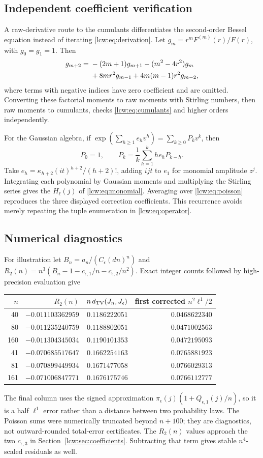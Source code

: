 \documentclass[11pt,letterpaper]{article}
\theoremstyle{remark}\newtheorem{remark}[theorem]{Remark}
\begin{document}
\subsection{Independent coefficient verification}
A raw-derivative route to the cumulants differentiates the second-order Bessel equation instead of iterating \eqref{lcw:eq:derivation}. Let $g_m=r^mF^{(m)}(r)/F(r)$, with $g_0=g_1=1$. Then
\begin{align}
 g_{m+2}={}&-(2m+1)g_{m+1}-(m^2-4r^2)g_m\notag\\
 &+8mr^2g_{m-1}+4m(m-1)r^2g_{m-2},\label{lcw:eq:rawrec}
\end{align}
where terms with negative indices have zero coefficient and are omitted. Converting these factorial moments to raw moments with Stirling numbers, then raw moments to cumulants, checks \eqref{lcw:eq:cumulants} and higher orders independently.

For the Gaussian algebra, if
$\exp(\sum_{h\ge1}e_hv^h)=\sum_{k\ge0}P_kv^k$, then
\[
 P_0=1,\qquad P_k=\frac1k\sum_{h=1}^k h e_h P_{k-h}.
\]
Take $e_h=\kappa_{h+2}(it)^{h+2}/(h+2)!$, adding $ijt$ to $e_1$ for monomial amplitude $z^j$. Integrating each polynomial by Gaussian moments and multiplying the Stirling series gives the $H_\ell(j)$ of \eqref{lcw:eq:monomial}. Averaging over \eqref{lcw:eq:poisson} reproduces the three displayed correction coefficients. This recurrence avoids merely repeating the tuple enumeration in \eqref{lcw:eq:operator}.

\subsection{Numerical diagnostics}
For illustration let $B_n=a_n/(C_\epsilon(dn)^n)$ and
$R_2(n)=n^3(B_n-1-c_{\epsilon,1}/n-c_{\epsilon,2}/n^2)$.
Exact integer counts followed by high-precision evaluation give
\begin{center}
\begin{tabular}{rrrr}
\toprule
$n$ & $R_2(n)$ & $n\,d_{\rm TV}(J_n,J_\epsilon)$ & first corrected $n^2\ell^1/2$\\
\midrule
40  & $-0.011103362959$ & $0.1186222051$ & $0.0468622340$\\
80  & $-0.011235240759$ & $0.1188802051$ & $0.0471002563$\\
160 & $-0.011304345034$ & $0.1190101353$ & $0.0472195093$\\
41  & $-0.070685517647$ & $0.1662254163$ & $0.0765881923$\\
81  & $-0.070899449934$ & $0.1671477058$ & $0.0766029313$\\
161 & $-0.071006847771$ & $0.1676175746$ & $0.0766112777$\\
\bottomrule
\end{tabular}
\end{center}
The final column uses the signed approximation $\pi_\epsilon(j)(1+Q_{\epsilon,1}(j)/n)$, so it is a half $\ell^1$ error rather than a distance between two probability laws. The Poisson sums were numerically truncated beyond $n+100$; they are diagnostics, not outward-rounded total-error certificates. The $R_2(n)$ values approach the two $c_{\epsilon,3}$ in Section~\ref{lcw:sec:coefficients}. Subtracting that term gives stable $n^4$-scaled residuals as well.
\end{document}
